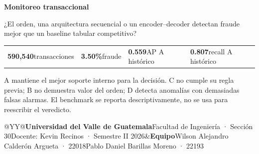 \documentclass[9pt]{article}
\begin{document}
\begin{titlepage}\pagecolor{navy}\color{white}
\vspace*{.25cm}{\small\bfseries DEEP LEARNING Y SISTEMAS INTELIGENTES\hfill PROYECTO 1 · V6\par}
\vspace{.35cm}{\color{teal}\rule{\linewidth}{2pt}}\vspace{.7cm}
{\Huge\bfseries Monitoreo transaccional\par}\vspace{.15cm}{\LARGE Evidencia del valor del orden y detección de anomalías\par}
\vspace{.65cm}{\large\bfseries Pregunta ejecutiva\par}\vspace{3pt}¿El orden, una arquitectura secuencial o un encoder--decoder detectan fraude mejor que un baseline tabular competitivo?
\vspace{.65cm}\begin{tabularx}{\linewidth}{@{}XXXX@{}}
\centering\textbf{590,540}\newline\scriptsize transacciones&\centering\textbf{3.50\%}\newline\scriptsize fraude&\centering\textbf{0.559}\newline\scriptsize AP A histórico&\centering\textbf{0.807}\newline\scriptsize recall A histórico
\end{tabularx}
\vspace{4pt}A mantiene el mejor soporte interno para la decisión. C no cumple su regla previa; B no demuestra valor del orden; D detecta anomalías con demasiadas falsas alarmas. El benchmark se reporta descriptivamente, no se usa para reescribir el veredicto.
\vfill\begin{tabularx}{\linewidth}{@{}YY@{}}\textbf{Universidad del Valle de Guatemala}\newline Facultad de Ingeniería · Sección 30\newline Docente: Kevin Recinos · Semestre II 2026&\textbf{Equipo}\newline Wilson Alejandro Calderón Argueta · 22018\newline Pablo Daniel Barillas Moreno · 22193\end{tabularx}
\end{titlepage}\hypersetup{pageanchor=true}\setcounter{page}{1}\nopagecolor\color{ink}
\end{document}
